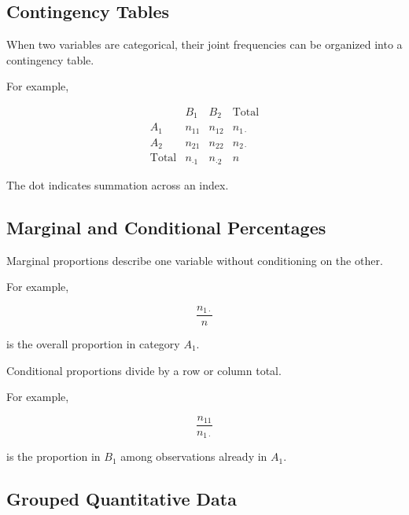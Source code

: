 \subsection{Contingency Tables}
\label{subsec:contingency-tables}

When two variables are categorical, their joint frequencies can be
organized into a contingency table.

For example,

\[
\begin{array}{c|cc|c}
&
B_1
&
B_2
&
\text{Total}
\\
\hline
A_1
&
n_{11}
&
n_{12}
&
n_{1\cdot}
\\
A_2
&
n_{21}
&
n_{22}
&
n_{2\cdot}
\\
\hline
\text{Total}
&
n_{\cdot1}
&
n_{\cdot2}
&
n
\end{array}
\]

The dot indicates summation across an index.

\subsection{Marginal and Conditional Percentages}
\label{subsec:marginal-conditional-percentages}

Marginal proportions describe one variable without conditioning on the
other.

For example,

\[
\boxed{
\frac{
n_{1\cdot}
}{n}
}
\]

is the overall proportion in category \(A_1\).

Conditional proportions divide by a row or column total.

For example,

\[
\boxed{
\frac{
n_{11}
}{
n_{1\cdot}
}
}
\]

is the proportion in \(B_1\) among observations already in \(A_1\).

\subsection{Grouped Quantitative Data}
\label{subsec:grouped-quantitative-data}

